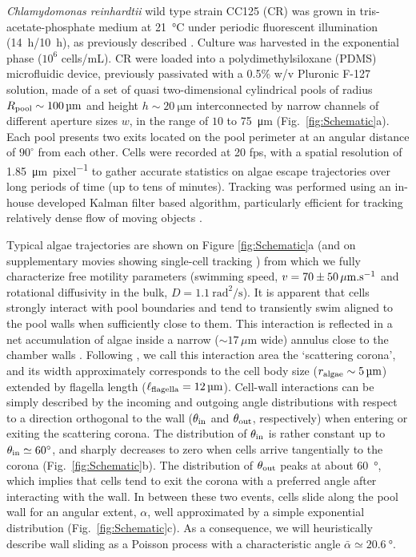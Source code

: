 \documentclass[aps,showpacs,superscriptaddress,amsfonts,twocolumn,prl]{revtex4}
\begin{document}
\textit{Chlamydomonas reinhardtii} wild type strain CC125 (CR) was grown in tris-acetate-phosphate medium at \SI{21}{\celsius} under periodic fluorescent illumination (\SI{14}{\hour}/\SI{10}{\hour}), as previously described \cite{Mathijssen2018}. Culture was harvested in the exponential phase ($10^6$ cells/mL). CR were loaded into a polydimethylsiloxane (PDMS) microfluidic device, previously passivated with a 0.5\% w/v Pluronic F-127 solution, made of a set of quasi two-dimensional cylindrical pools of radius $R_{\rm pool} \sim \SI{100}{\micro\meter}$ and height $h\sim \SI{20}{\micro\meter}$ interconnected by narrow channels of different aperture sizes $w$, in the range of $10$ to \SI{75}{\micro\meter} (Fig.~\ref{fig:Schematic}a). Each pool presents two exits located on the pool perimeter at an angular distance of $90^{\circ}$ from each other. Cells were recorded at 20 fps, with a spatial resolution of \SI{1.85}{\micro\meter\per pixel} to gather accurate statistics on algae escape trajectories over long periods of time (up to tens of minutes). Tracking was performed using an in-house developed Kalman filter based algorithm, particularly efficient for tracking relatively dense flow of moving objects \cite{Kalman1960,Souzy2020}.

Typical algae trajectories are shown on Figure \ref{fig:Schematic}a (and on supplementary movies showing single-cell tracking \cite{ref-Movie1,ref-Movie2}) from which we fully characterize free motility parameters (swimming speed, $v=70 \pm50\,\mu\rm{m.s}^{-1}$ and rotational diffusivity in the bulk, $D=\SI{1.1}{\square\radian\per\second}$). It is apparent that cells strongly interact with pool boundaries and tend to transiently swim aligned to the pool walls when sufficiently close to them. This interaction is reflected in a net accumulation of algae inside a narrow ($\sim 17\,\mu$m wide) annulus close to the chamber walls \cite{Ostapenko2018}. Following \cite{Contino2015}, we call this interaction area the `scattering corona', and its width approximately corresponds to the cell body size ($ r_{\rm{algae}}\sim\SI{5}{\micro\meter}$) extended by flagella length ($\ell_{\rm{flagella}} = \SI{12}{\micro\meter}$). Cell-wall interactions can be simply described by the incoming and outgoing angle distributions with respect to a direction orthogonal to the wall ($\theta_{\rm in}$ and $\theta_{\rm out}$, respectively) when entering or exiting the scattering corona. The distribution of  $\theta_{\rm in}$ is rather constant up to $\theta_{\rm in}\simeq\SI{60}{\degree}$, and sharply decreases to zero when cells arrive tangentially to the corona (Fig.~\ref{fig:Schematic}b). The distribution of $\theta_{\rm out}$ peaks at about \SI{60}{\degree}, which implies that cells tend to exit the corona with a preferred angle after interacting with the wall. In between these two events, cells slide along the pool wall for an angular extent, $\alpha$, well approximated by a simple exponential distribution (Fig.~\ref{fig:Schematic}c). As a consequence, we will heuristically describe wall sliding as a Poisson process with a characteristic angle $\bar{\alpha} \simeq \SI{20.6}{\degree}$.
\end{document}
